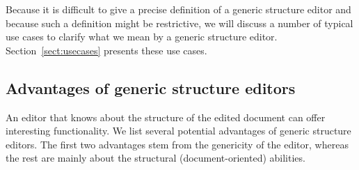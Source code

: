 Because it is difficult to give a precise definition of a generic structure editor and because such a definition might be restrictive, we will discuss a number of typical use cases to clarify what we mean by a generic structure editor. Section~\ref{sect:usecases} presents these use cases.





%								
\subsection{Advantages of generic structure editors}

An editor that knows about the structure of the edited document can offer interesting functionality. We list several potential advantages of generic structure editors. The first two advantages stem from the genericity of the editor, whereas the rest are mainly about the structural (document-oriented) abilities.

